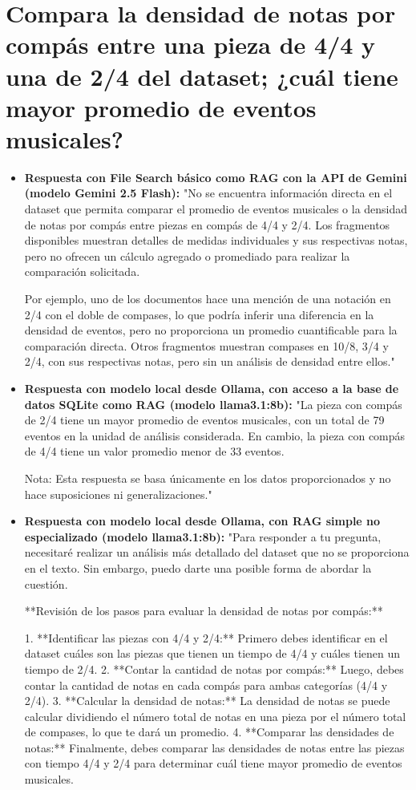 \section{Compara la densidad de notas por compás entre una pieza de 4/4 y una de 2/4 del dataset; ¿cuál tiene mayor promedio de eventos musicales?}
\begin{itemize}
    \item \textbf{Respuesta con File Search básico como RAG con la API de Gemini (modelo Gemini 2.5 Flash):} "No se encuentra información directa en el dataset que permita comparar el promedio de eventos musicales o la densidad de notas por compás entre piezas en compás de 4/4 y 2/4. Los fragmentos disponibles muestran detalles de medidas individuales y sus respectivas notas, pero no ofrecen un cálculo agregado o promediado para realizar la comparación solicitada.

Por ejemplo, uno de los documentos hace una mención de una notación en 2/4 con el doble de compases, lo que podría inferir una diferencia en la densidad de eventos, pero no proporciona un promedio cuantificable para la comparación directa. Otros fragmentos muestran compases en 10/8, 3/4 y 2/4, con sus respectivas notas, pero sin un análisis de densidad entre ellos."
    \item \textbf{Respuesta con modelo local desde Ollama, con acceso a la base de datos SQLite como RAG (modelo llama3.1:8b):} "La pieza con compás de 2/4 tiene un mayor promedio de eventos musicales, con un total de 79 eventos en la unidad de análisis considerada. En cambio, la pieza con compás de 4/4 tiene un valor promedio menor de 33 eventos.

Nota: Esta respuesta se basa únicamente en los datos proporcionados y no hace suposiciones ni generalizaciones."
\item \textbf{Respuesta con modelo local desde Ollama, con RAG simple no especializado (modelo llama3.1:8b):} "Para responder a tu pregunta, necesitaré realizar un análisis más detallado del dataset que no se proporciona en el texto. Sin embargo, puedo darte una posible forma de abordar la cuestión.

**Revisión de los pasos para evaluar la densidad de notas por compás:**

1.  **Identificar las piezas con 4/4 y 2/4:** Primero debes identificar en el dataset cuáles son las piezas que tienen un tiempo de 4/4 y cuáles tienen un tiempo de 2/4.
2.  **Contar la cantidad de notas por compás:** Luego, debes contar la cantidad de notas en cada compás para ambas categorías (4/4 y 2/4).
3.  **Calcular la densidad de notas:** La densidad de notas se puede calcular dividiendo el número total de notas en una pieza por el número total de compases, lo que te dará un promedio.
4.  **Comparar las densidades de notas:** Finalmente, debes comparar las densidades de notas entre las piezas con tiempo 4/4 y 2/4 para determinar cuál tiene mayor promedio de eventos musicales.


\end{itemize}

